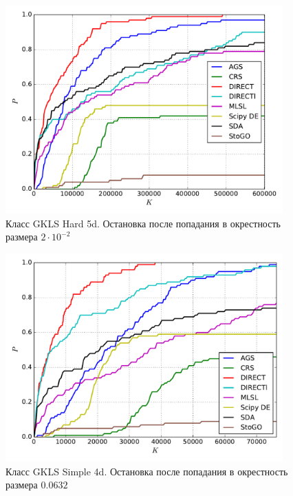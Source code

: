 \documentclass[a4paper]{article}
\begin{document}
\begin{figure}[H]
  \center
  \includegraphics[width=0.95\textwidth]{../experiments/gklsh5d/cmc.pdf}
  \caption{Класс GKLS Hard 5d. Остановка после попадания в окрестность размера $2\cdot10^{-2}$}
  \label{fig:}
\end{figure}


\begin{figure}[H]
  \center
  \includegraphics[width=0.95\textwidth]{../experiments/gklss4d/cmc.pdf}
  \caption{Класс GKLS Simple 4d. Остановка после попадания в окрестность размера $0.0632$}
  \label{fig:}
\end{figure}

\end{document}

